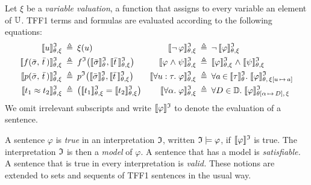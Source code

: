 Let $\xi$ be a {\em variable valuation}, a function that assigns
to every variable an element of $\univ$. TFF1 terms
and formulas are evaluated according to the following equations:
\begin{align*}
\eval{u} &\eqdef \xi(u) &
  \eval{\lnot\, \varphi} &\eqdef \lnot\, \eval{\varphi} \\
\eval{f(\bar{\sigma},\,\bar{t}\,)} &\eqdef f^\cI\bigl(\evalT{\bar{\sigma}},\eval{\bar{t}\,}\bigr) &
  \eval{\varphi \rand \psi} &\eqdef \eval{\varphi} \rand \eval{\psi} \\
\eval{p(\bar{\sigma},\,\bar{t}\,)} &\eqdef p^\cI\bigl(\evalT{\bar{\sigma}},\eval{\bar{t}\,}\bigr) &
  \eval{\forall u \ty \tau .\; \varphi} &\eqdef \forall {a \mathbin\in \evalT{\tau}} .\;
  \smash{\evalG{\varphi}_{\theta,\,\xi[u\,\mapsto\,a]}} \\
\eval{t_1 \eq t_2} &\eqdef \bigl(\eval{t_1} = \eval{t_2}\bigr) &
  \eval{\forall \alpha .\; \varphi} &\eqdef \forall {D \in \sorts} .\;
  \smash{\evalG{\varphi}_{\theta[\alpha\,\mapsto\,D],\,\xi}}
\end{align*}
We omit irrelevant subscripts and write
$\evalG{\varphi}$ to denote the evaluation of a sentence.

A sentence $\varphi$ is {\em true} in an interpretation $\cI$,
written $\cI \models \varphi$, \iff{} if $\evalG{\varphi}$ is true.
The interpretation $\cI$ is then a {\em model\/} of $\varphi$.
A sentence that has a model is {\em satisfiable.}
A sentence that is true in every interpretation is {\em valid.}
These notions are extended to sets and sequents of TFF1 sentences in
the usual way.
